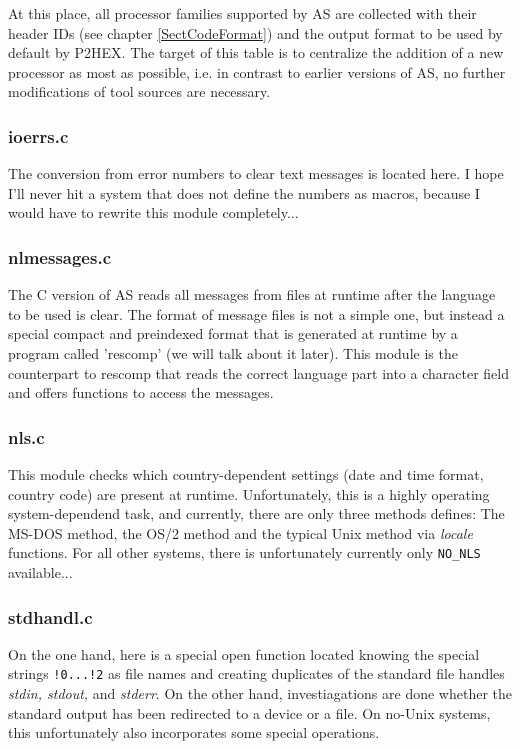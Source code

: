 \documentclass[12pt,twoside]{report}
\newcommand{\asname}{{AS}}
\begin{document}
At this place, all processor families supported by \asname{} are collected with
their header IDs (see chapter \ref{SectCodeFormat}) and the output format
to be used by default by P2HEX.  The target of this table is to centralize
the addition of a new processor as most as possible, i.e. in contrast to
earlier versions of \asname{}, no further modifications of tool sources are
necessary.

\subsubsection{ioerrs.c}

The conversion from error numbers to clear text messages is located here.
I hope I'll never hit a system that does not define the numbers as macros,
because I would have to rewrite this module completely...

\subsubsection{nlmessages.c}

The C version of \asname{} reads all messages from files at runtime after the
language to be used is clear.  The format of message files is not a simple
one, but instead a special compact and preindexed format that is generated
at runtime by a program called 'rescomp' (we will talk about it later).
This module is the counterpart to rescomp that reads the correct language
part into a character field and offers functions to access the messages.

\subsubsection{nls.c}

This module checks which country-dependent settings (date and time format,
country code) are present at runtime.  Unfortunately, this is a highly
operating system-dependend task, and currently, there are only three
methods defines: The MS-DOS method, the OS/2 method and the typical Unix
method via {\em locale} functions.  For all other systems, there is
unfortunately currently only \verb!NO_NLS! available...

\subsubsection{stdhandl.c}

On the one hand, here is a special open function located knowing the
special strings {\tt !0...!2} as file names and creating duplicates of the
standard file handles {\em stdin, stdout,} and {\em stderr}.  On the other
hand, investiagations are done whether the standard output has been
redirected to a device or a file.  On no-Unix systems, this unfortunately
also incorporates some special operations.
\end{document}
